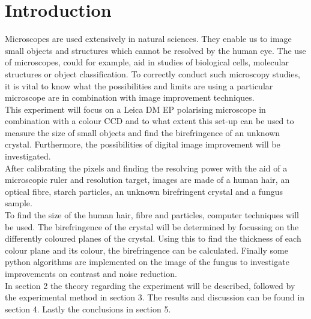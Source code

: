 \section{Introduction}
Microscopes are used extensively in natural sciences. They enable us to image small objects and structures which cannot be resolved by the human eye. The use of microscopes, could for example, aid in studies of biological cells, molecular structures or object classification. To correctly conduct such microscopy studies, it is vital to know what the possibilities and limits are using a particular microscope are in combination with image improvement techniques.\\
This experiment will focus on a Leica DM EP polarising microscope in combination with a colour CCD and to what extent this set-up can be used to measure the size of small objects and find the birefringence of an unknown crystal. Furthermore, the possibilities of digital image improvement will be investigated.\\
After calibrating the pixels and finding the resolving power with the aid of a microscopic ruler and resolution target, images are made of a human hair, an optical fibre, starch particles, an unknown birefringent crystal and a fungus sample.\\
To find the size of the human hair, fibre and particles, computer techniques will be used. The birefringence of the crystal will be determined by focussing on the differently coloured planes of the crystal. Using this to find the thickness of each colour plane and its colour, the birefringence can be calculated. Finally some python algorithms are implemented on the image of the fungus to investigate improvements on contrast and noise reduction.\\
In section 2 the theory regarding the experiment will be described, followed by the experimental method in section 3. The results and discussion can be found in section 4. Lastly the conclusions in section 5.









\begin{comment}
    TheInleiding ( Introduction) describes:   -The  research  question.  (Be  as  precise  as  possible.  Not:  “We  investigate  on  which  parameters  the  bubble  behaviour  depends”,  but  “we  study  the  relationship  between  the  path  of  bubbles  at  a  microfluidic T-junction, and the velocity and length of those bubbles).\\-The relevance of the research question (for science and/or technology).\\-The state-of-art: what is already know? (including references to prior literature).\\-A brief description of the research method/approach.\\-A brief description of the structure/contents of the rest of the report.\\The  introduction  should  be  self-contained,  without  reference  to  the  manual  or  to  the  remainder  of  the  report, and should be understandable to readers who know nothing about the research.
\end{comment}